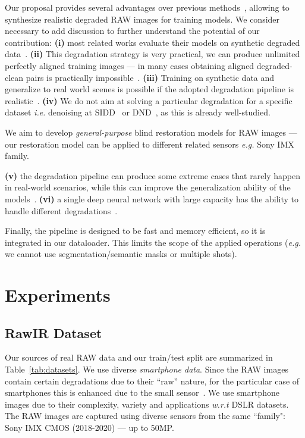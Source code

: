 \documentclass{article}
\newcommand{\ie}{\emph{i.e.} }
\newcommand{\eg}{\emph{e.g.} }
\begin{document}
Our proposal provides several advantages over previous methods~\cite{xu2019rawsr, xu2020exploiting}, allowing to synthesize realistic degraded RAW images for training models. We consider necessary to add discussion to further understand the potential of our contribution: \textbf{(i)} most related works evaluate their models on synthetic degraded data~\cite{nah2017Gopro, xu2019rawsr, qian2019trinity, kai2021bsrgan}. \textbf{(ii)} This degradation strategy is very practical, we can produce unlimited perfectly aligned training images --- in many cases obtaining aligned degraded-clean pairs is practically impossible~\cite{nah2017Gopro}. \textbf{(iii)} Training on synthetic data and generalize to real world scenes is possible if the adopted degradation pipeline is realistic~\cite{kai2021bsrgan, nah2017Gopro}. \textbf{(iv)} We do not aim at solving a particular degradation for a specific dataset \ie denoising at SIDD~\cite{abdelhamed2018high} or DND~\cite{plotz2017benchmarking}, as this is already well-studied.%

We aim to develop \textit{general-purpose} blind restoration models for RAW images --- our restoration model can be applied to different related sensors \eg Sony IMX family. 

\textbf{(v)} the degradation pipeline can produce some extreme cases that rarely happen in real-world scenarios, while this can improve the generalization ability of the models~\cite{kai2021bsrgan}.
\textbf{(vi)} a single deep neural network with large capacity has the ability to handle different degradations~\cite{kai2021bsrgan, xu2019rawsr}.

Finally, the pipeline is designed to be fast and memory efficient, so it is integrated in our dataloader. This limits the scope of the applied operations (\eg we cannot use segmentation/semantic masks or multiple shots). 

\section{Experiments}

\subsection{RawIR Dataset}
\label{sec:datasets}

Our sources of real RAW data and our train/test split are summarized in Table~\ref{tab:datasets}. We use diverse \emph{smartphone data}. Since the RAW images contain certain degradations due to their ``raw'' nature, for the particular case of smartphones this is enhanced due to the small sensor~\cite{delbracio2021mobile}. We use smartphone images due to their complexity, variety and applications \emph{w.r.t} DSLR datasets. The RAW images are captured using diverse sensors from the same ``family": Sony IMX CMOS (2018-2020) --- up to 50MP.
\end{document}
